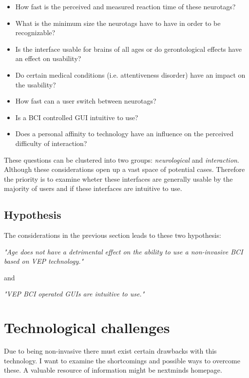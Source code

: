             \begin{itemize}
                \item How fast is the perceived and measured reaction time of these neurotags?
                \item What is the minimum size the neurotags have to have in order to be recognizable?
                \item Is the interface usable for brains of all ages or do gerontological effects have an effect on usability?
                \item Do certain medical conditions (i.e. attentiveness disorder) have an impact on the usability?
                \item How fast can a user switch between neurotags?
                \item Is a BCI controlled GUI intuitive to use?
                \item Does a personal affinity to technology have an influence on the perceived difficulty of interaction?
            \end{itemize}

            These questions can be clustered into two groups: \textit{neurological} and \textit{interaction}. Although these considerations open up a vast space of potential cases. Therefore the priority is to examine wheter these interfaces are generally usable by the majority of users and if these interfaces are intuitive to use. 

        \section{Hypothesis}

            The considerations in the previous section leads to these two hypothesis:

            \medskip
            \emph{"Age does not have a detrimental effect on the ability to use a non-invasive BCI based on VEP technology."}
            \medskip

            and

            \medskip
            \emph{"VEP BCI operated GUIs are intuitive to use."}
            \medskip

    \chapter{Technological challenges}

        Due to being non-invasive there must exist certain drawbacks with this technology. I want to examine the shortcomings and possible ways to overcome these.    
        A valuable resource of information might be nextminds homepage.

